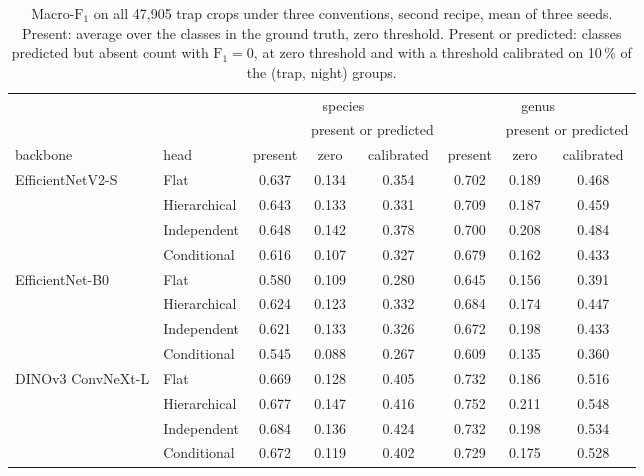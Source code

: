\begin{table}[htb]
    \centering
    \caption{Macro-$\text{F}_1$ on all 47,905 trap crops under three conventions, second recipe, mean of three seeds. Present: average over the classes in the ground truth, zero threshold. Present or predicted: classes predicted but absent count with $\text{F}_1 = 0$, at zero threshold and with a threshold calibrated on 10\,\% of the (trap, night) groups.}
    \label{tab:conventions}
    \begin{tabular}{llcccccc}
        \toprule
        & & \multicolumn{3}{c}{species} & \multicolumn{3}{c}{genus} \\
        & & & \multicolumn{2}{c}{present or predicted} & & \multicolumn{2}{c}{present or predicted} \\
        backbone & head & present & zero & calibrated & present & zero & calibrated \\
        \midrule
        EfficientNetV2-S & Flat & 0.637 & 0.134 & 0.354 & 0.702 & 0.189 & 0.468 \\
         & Hierarchical & 0.643 & 0.133 & 0.331 & 0.709 & 0.187 & 0.459 \\
         & Independent & 0.648 & 0.142 & 0.378 & 0.700 & 0.208 & 0.484 \\
         & Conditional & 0.616 & 0.107 & 0.327 & 0.679 & 0.162 & 0.433 \\
        \midrule
        EfficientNet-B0 & Flat & 0.580 & 0.109 & 0.280 & 0.645 & 0.156 & 0.391 \\
         & Hierarchical & 0.624 & 0.123 & 0.332 & 0.684 & 0.174 & 0.447 \\
         & Independent & 0.621 & 0.133 & 0.326 & 0.672 & 0.198 & 0.433 \\
         & Conditional & 0.545 & 0.088 & 0.267 & 0.609 & 0.135 & 0.360 \\
        \midrule
        DINOv3 ConvNeXt-L & Flat & 0.669 & 0.128 & 0.405 & 0.732 & 0.186 & 0.516 \\
         & Hierarchical & 0.677 & 0.147 & 0.416 & 0.752 & 0.211 & 0.548 \\
         & Independent & 0.684 & 0.136 & 0.424 & 0.732 & 0.198 & 0.534 \\
         & Conditional & 0.672 & 0.119 & 0.402 & 0.729 & 0.175 & 0.528 \\
        \bottomrule
    \end{tabular}
\end{table}

